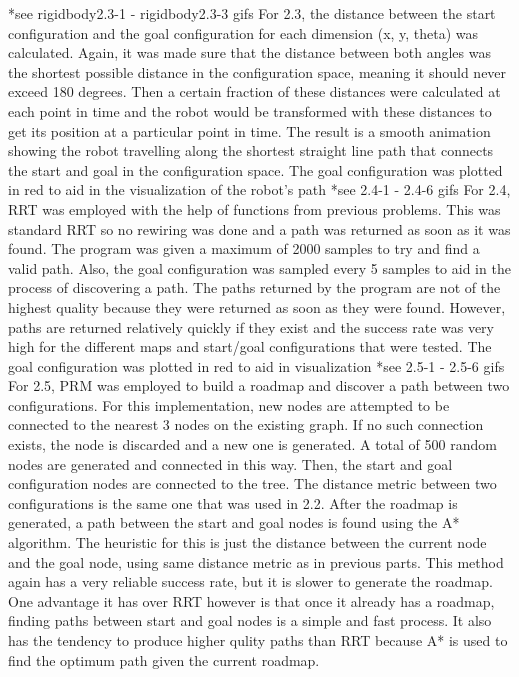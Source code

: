 \documentclass{article}
\begin{document}
*see rigidbody2.3-1 - rigidbody2.3-3 gifs
\newline
For 2.3, the distance between the start configuration and the goal configuration for each dimension (x, y, theta) was calculated. Again, it was made sure that the distance between both angles was the shortest possible distance in the configuration space, meaning it should never exceed 180 degrees. Then a certain fraction of these distances were calculated at each point in time and the robot would be transformed with these distances to get its position at a particular point in time. The result is a smooth animation showing the robot travelling along the shortest straight line path that connects the start and goal in the configuration space. The goal configuration was plotted in red to aid in the visualization of the robot's path
\newline
*see 2.4-1 - 2.4-6 gifs
\newline
For 2.4, RRT was employed with the help of functions from previous problems. This was standard RRT so no rewiring was done and a path was returned as soon as it was found. The program was given a maximum of 2000 samples to try and find a valid path. Also, the goal configuration was sampled every 5 samples to aid in the process of discovering a path. The paths returned by the program are not of the highest quality because they were returned as soon as they were found. However, paths are returned relatively quickly if they exist and the success rate was very high for the different maps and start/goal configurations that were tested. The goal configuration was plotted in red to aid in visualization
\newline
*see 2.5-1 - 2.5-6 gifs
\newline
For 2.5, PRM was employed to build a roadmap and discover a path between two configurations. For this implementation, new nodes are attempted to be connected to the nearest 3 nodes on the existing graph. If no such connection exists, the node is discarded and a new one is generated. A total of 500 random nodes are generated and connected in this way.  Then, the start and goal configuration nodes are connected to the tree. The distance metric between two configurations is the same one that was used in 2.2. After the roadmap is generated, a path between the start and goal nodes is found using the A* algorithm. The heuristic for this is just the distance between the current node and the goal node, using same distance metric as in previous parts. This method again has a very reliable success rate, but it is slower to generate the roadmap. One advantage it has over RRT however is that once it already has a roadmap, finding paths between start and goal nodes is a simple and fast process. It also has the tendency to produce higher qulity paths than RRT because A* is used to find the optimum path given the current roadmap.
\end{document}
